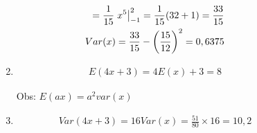 \begin{description}
\begin{description}
\begin{enumerate}[label=(\alph*)]
\begin{align*}
               =\frac{1}{15}\left.x^5\right\rvert_{-1}^{2}
               =\frac{1}{15}(32+1)=\frac{33}{15}\\
               Var(x)=\frac{33}{15}-\left(\frac{15}{12}\right)^2=0,6375
             \end{align*}
           \item 
             \begin{align*}
               E(4x+3)=4E(x)+3
               =8
             \end{align*}
             \begin{description}
             Obs: $E(ax)= a^2 var(x)$
           \end{description} 
         \item 
           \begin{align*}
             Var(4x+3) = 16 Var(x)= \frac{51}{80}\times16= 10,2
           \end{align*}
         \end{enumerate}
       \end{description}
     \end{description}
